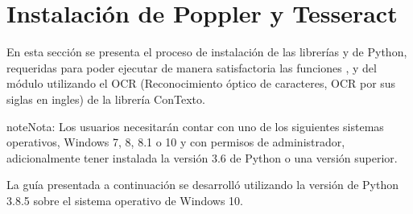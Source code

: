 \documentclass[letterpaper,10pt,openany,spanish]{sphinxmanual}
\begin{document}
\section{Instalación de Poppler y Tesseract}
\label{\detokenize{instalacion/instalacion_popple_teseract:instalacion-de-poppler-y-tesseract}}\label{\detokenize{instalacion/instalacion_popple_teseract:instalacion-poppler-tesseract}}\label{\detokenize{instalacion/instalacion_popple_teseract::doc}}
En esta sección se presenta el proceso de instalación de las librerías  y  de Python, requeridas para poder ejecutar de manera satisfactoria las funciones {\hyperref[\detokenize{funciones/lectura:lectura.Lector.archivo_a_texto}]{}}, {\hyperref[\detokenize{funciones/lectura:lectura.Lector.leer_pdf}]{}} y {\hyperref[\detokenize{funciones/lectura:lectura.leer_texto}]{}} del módulo {\hyperref[\detokenize{funciones/lectura:module-lectura}]{}} utilizando  el OCR (Reconocimiento óptico de caracteres, OCR por sus siglas en ingles) de la librería ConTexto.

\begin{sphinxadmonition}{note}{Nota:}
Los usuarios necesitarán contar con uno de los siguientes sistemas operativos, Windows 7, 8, 8.1 o 10 y con permisos de administrador, adicionalmente tener instalada la versión 3.6 de Python o una versión superior.

La guía presentada a continuación se desarrolló utilizando la versión de Python 3.8.5 sobre el sistema operativo de Windows 10.
\end{sphinxadmonition}
\end{document}
